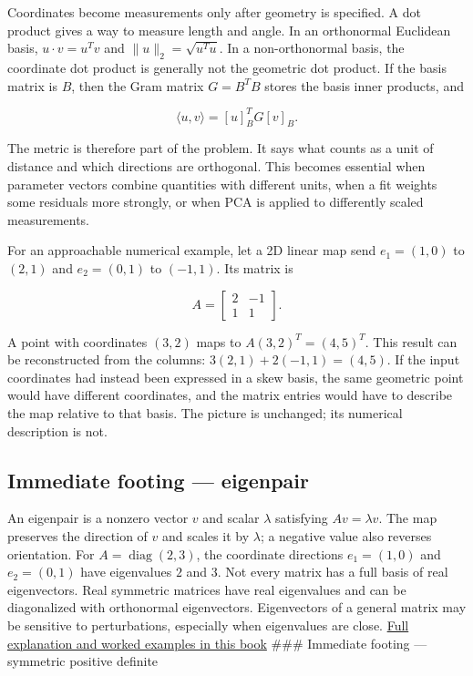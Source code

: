 Coordinates become measurements only after geometry is specified. A dot product gives a way to measure length and angle. In an orthonormal Euclidean basis, \(u\cdot v=u^Tv\) and \(\|u\|_2=\sqrt{u^Tu}\). In a non-orthonormal basis, the coordinate dot product is generally not the geometric dot product. If the basis matrix is \(B\), then the Gram matrix \(G=B^TB\) stores the basis inner products, and

\[
\langle u,v\rangle = [u]_B^T G [v]_B.
\]

The metric is therefore part of the problem. It says what counts as a unit of distance and which directions are orthogonal. This becomes essential when parameter vectors combine quantities with different units, when a fit weights some residuals more strongly, or when PCA is applied to differently scaled measurements.

For an approachable numerical example, let a 2D linear map send \(e_1=(1,0)\) to \((2,1)\) and \(e_2=(0,1)\) to \((-1,1)\). Its matrix is

\[
A=\begin{bmatrix}2&-1\\1&1\end{bmatrix}.
\]

A point with coordinates \((3,2)\) maps to \(A(3,2)^T=(4,5)^T\). This result can be reconstructed from the columns: \(3(2,1)+2(-1,1)=(4,5)\). If the input coordinates had instead been expressed in a skew basis, the same geometric point would have different coordinates, and the matrix entries would have to describe the map relative to that basis. The picture is unchanged; its numerical description is not.

\subsection{Immediate footing --- eigenpair}\label{01-foundations-i-ch018-immediate-footing-eigenpair}

An eigenpair is a nonzero vector \(v\) and scalar \(\lambda\) satisfying \(Av=\lambda v\). The map preserves the direction of \(v\) and scales it by \(\lambda\); a negative value also reverses orientation. For \(A=\operatorname{diag}(2,3)\), the coordinate directions \(e_1=(1,0)\) and \(e_2=(0,1)\) have eigenvalues \(2\) and \(3\). Not every matrix has a full basis of real eigenvectors. Real symmetric matrices have real eigenvalues and can be diagonalized with orthonormal eigenvectors. Eigenvectors of a general matrix may be sensitive to perturbations, especially when eigenvalues are close. \hyperref[01-foundations-i-ch020-eigenvectors-reveal-the-directions-a-square-map-does-not-turn]{Full explanation and worked examples in this book} \#\#\# Immediate footing --- symmetric positive definite

